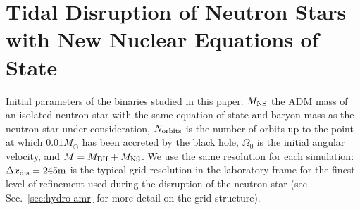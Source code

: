 \chapter{Tidal Disruption of Neutron Stars with New Nuclear Equations of State}
\label{chap:chapter-5}


\begin{table}
	\begin{center}
	\caption[Initial parameters of binaries used in this survey]{
		Initial parameters of the binaries studied in this paper. 
		$M_{\rm NS}$ the ADM mass of an isolated neutron star with the same equation of state and baryon mass as the neutron star under
		consideration, $N_{\rm orbits}$ is the number of orbits up to the point at which $0.01M_\odot$ has been accreted by the black hole,
		$\Omega_0$ is the initial angular velocity, and $M=M_{\rm BH}+M_{\rm NS}$. We use the same resolution for each simulation: $\Delta x_{\rm dis} = 245{\rm m}$ is the typical grid resolution in the laboratory frame
		for the finest level of refinement used during the disruption of the neutron star (see Sec.~\ref{sec:hydro-amr} for more detail on the grid structure).}
	{
		
	}
\end{center}
\end{table}
